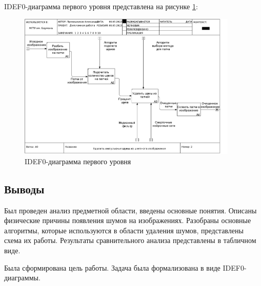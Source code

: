 IDEF0-диаграмма первого уровня представлена на рисунке \ref{idef0::1}:

\FloatBarrier
\begin{figure}[h]	
	\begin{center}
		\includegraphics[height=7cm]{inc/pdf/02_A0.pdf}
	\end{center}
	\captionsetup{justification=centering}
	\caption{IDEF0-диаграмма первого уровня}
	\label{idef0::1}
\end{figure}
\FloatBarrier

\subsection*{Выводы}
Был проведен анализ предметной области, введены основные понятия.
Описаны физические причины появления шумов на изображениях.
Разобраны основные алгоритмы, которые используются в области удаления шумов, представлены схема их работы.
Результаты сравнительного анализа представлены в табличном виде.

Была сформирована цель работы.
Задача была формализована в виде IDEF0-диаграммы.